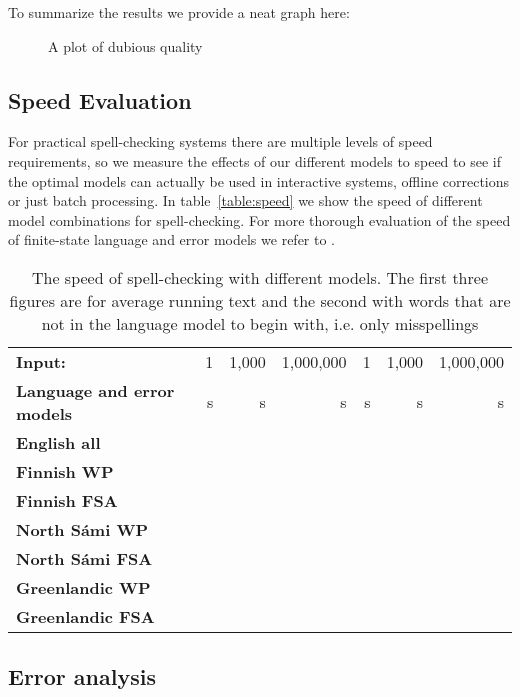 \documentclass[a4paper,12pt]{article}
\begin{document}
To summarize the results we provide a neat graph here:

\begin{figure}
    \centering
    \caption{A plot of dubious quality
    \label{fig:quality}}
\end{figure}


\subsection{Speed Evaluation}

For practical spell-checking systems there are multiple levels of speed
requirements, so we measure the effects of our different models to speed to
see if the optimal models can actually be used in interactive systems, offline
corrections or just batch processing. In table~\ref{table:speed} we show the
speed of different model combinations for spell-checking. For more thorough
evaluation of the speed of finite-state language and error models we refer to
\cite{pirinen2012speed}.

\begin{table}
    \centering
    \begin{tabular}{|l|r|r|r||r|r|r|}
        \hline
        \bf Input: & 1 & 1,000 & 1,000,000 & 1 & 1,000 & 1,000,000 \\
        \bf Language and error models & s & s & s & s & s & s \\
        \hline
          \bf English all & & & & & & \\
        \hline
        \bf Finnish WP & & & & & & \\
       \bf Finnish FSA & & & & & & \\
        \hline
        \bf North Sámi WP & & & & & & \\
        \bf North Sámi FSA& & & & & & \\
        \hline
        \bf Greenlandic WP & & & & & & \\
       \bf Greenlandic FSA & & & & & & \\
        \hline
    \end{tabular}
    \caption{The speed of spell-checking with different models. The first three
    figures are for average running text and the second with words that are not
    in the language model to begin with, i.e. only
    misspellings\label{table:baseline-quality}}
\end{table}

\subsection{Error analysis}
\label{subsec:error-analysis}
\end{document}
